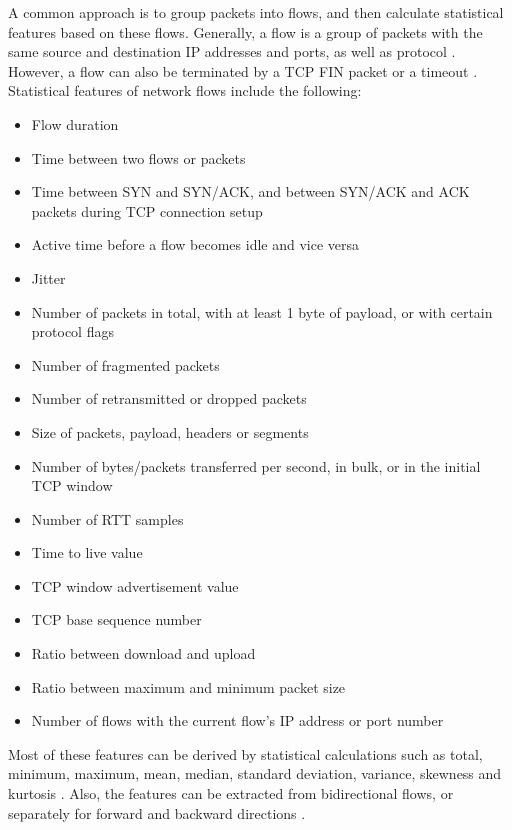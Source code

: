\documentclass[conference]{IEEEtran}
\begin{document}
A common approach is to group packets into flows, and then calculate statistical features based on these flows. Generally, a flow is a group of packets with the same source and destination IP addresses and ports, as well as protocol \cite{brownlee1998}. However, a flow can also be terminated by a TCP FIN packet or a timeout \cite{Ids2018}. Statistical features of network flows include the following:
\begin{itemize}
	\item Flow duration \cite{Nb2015} \cite{Ids2018}
	\item Time between two flows or packets \cite{Ids2018}
	\item Time between SYN and SYN/ACK, and between SYN/ACK and ACK packets during TCP connection setup \cite{Nb2015}
	\item Active time before a flow becomes idle and vice versa \cite{Ids2018}
	\item Jitter \cite{Nb2015}
	\item Number of packets in total, with at least 1 byte of payload, or with certain protocol flags \cite{Ids2018} \cite{waizumi2007} \cite{celik2015}
	\item Number of fragmented packets \cite{waizumi2007}
	\item Number of retransmitted or dropped packets \cite{Nb2015}
	\item Size of packets, payload, headers or segments \cite{Ids2018} \cite{celik2015}
	\item Number of bytes/packets transferred per second, in bulk, or in the initial TCP window \cite{Ids2018} \cite{celik2015}
	\item Number of RTT samples \cite{celik2015}
	\item Time to live value \cite{Nb2015}
	\item TCP window advertisement value \cite{Nb2015}
	\item TCP base sequence number \cite{Nb2015}
	\item Ratio between download and upload \cite{Ids2018}
	\item Ratio between maximum and minimum packet size \cite{celik2015}
	\item Number of flows with the current flow's IP address or port number \cite{waizumi2007} \cite{Nb2015}
\end{itemize}
Most of these features can be derived by statistical calculations such as total, minimum, maximum, mean, median, standard deviation, variance, skewness and kurtosis \cite{Ids2018} \cite{celik2015, xu2015}. Also, the features can be extracted from bidirectional flows, or separately for forward and backward directions \cite{Ids2018}.
\end{document}
